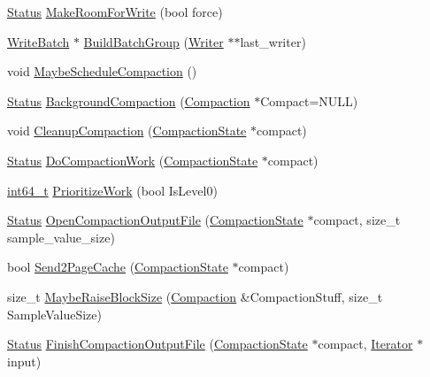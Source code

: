 \begin{DoxyCompactItemize}
\item 
\hyperlink{classleveldb_1_1_status}{Status} \hyperlink{classleveldb_1_1_d_b_impl_af0d16a6725c9509a39b20671783b3590}{Make\+Room\+For\+Write} (bool force)
\item 
\hyperlink{classleveldb_1_1_write_batch}{Write\+Batch} $\ast$ \hyperlink{classleveldb_1_1_d_b_impl_a9e6ce4d7fffcf59575053f7d5c5e886b}{Build\+Batch\+Group} (\hyperlink{structleveldb_1_1_d_b_impl_1_1_writer}{Writer} $\ast$$\ast$last\+\_\+writer)
\item 
void \hyperlink{classleveldb_1_1_d_b_impl_aa71ed4506b6c721e898b09348ad9a4e2}{Maybe\+Schedule\+Compaction} ()
\item 
\hyperlink{classleveldb_1_1_status}{Status} \hyperlink{classleveldb_1_1_d_b_impl_a74e4c4cea1a0b49b52ba695339772af3}{Background\+Compaction} (\hyperlink{classleveldb_1_1_compaction}{Compaction} $\ast$Compact=N\+U\+L\+L)
\item 
void \hyperlink{classleveldb_1_1_d_b_impl_a1d8ed5e9ba41ca0e8e5f4c7e4c2e9a48}{Cleanup\+Compaction} (\hyperlink{structleveldb_1_1_d_b_impl_1_1_compaction_state}{Compaction\+State} $\ast$compact)
\item 
\hyperlink{classleveldb_1_1_status}{Status} \hyperlink{classleveldb_1_1_d_b_impl_a9b86cb14563a0e4b780d167f3c0623ac}{Do\+Compaction\+Work} (\hyperlink{structleveldb_1_1_d_b_impl_1_1_compaction_state}{Compaction\+State} $\ast$compact)
\item 
\hyperlink{stdint_8h_adec1df1b8b51cb32b77e5b86fff46471}{int64\+\_\+t} \hyperlink{classleveldb_1_1_d_b_impl_a76fee3ecaddb0f2d19e9ae700a442f2b}{Prioritize\+Work} (bool Is\+Level0)
\item 
\hyperlink{classleveldb_1_1_status}{Status} \hyperlink{classleveldb_1_1_d_b_impl_aa076fec282acd86319e69bdbead4e1d5}{Open\+Compaction\+Output\+File} (\hyperlink{structleveldb_1_1_d_b_impl_1_1_compaction_state}{Compaction\+State} $\ast$compact, size\+\_\+t sample\+\_\+value\+\_\+size)
\item 
bool \hyperlink{classleveldb_1_1_d_b_impl_a591bcd54b73867b69f79558ffa17e2da}{Send2\+Page\+Cache} (\hyperlink{structleveldb_1_1_d_b_impl_1_1_compaction_state}{Compaction\+State} $\ast$compact)
\item 
size\+\_\+t \hyperlink{classleveldb_1_1_d_b_impl_aadf4226ec51b2c106852def66911a73e}{Maybe\+Raise\+Block\+Size} (\hyperlink{classleveldb_1_1_compaction}{Compaction} \&Compaction\+Stuff, size\+\_\+t Sample\+Value\+Size)
\item 
\hyperlink{classleveldb_1_1_status}{Status} \hyperlink{classleveldb_1_1_d_b_impl_af4f178de1d55d5cf05b9a5cd17d07160}{Finish\+Compaction\+Output\+File} (\hyperlink{structleveldb_1_1_d_b_impl_1_1_compaction_state}{Compaction\+State} $\ast$compact, \hyperlink{classleveldb_1_1_iterator}{Iterator} $\ast$input)
$$
\end{DoxyCompactItemize}
